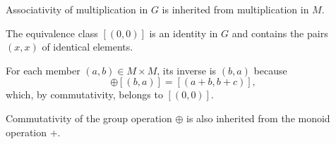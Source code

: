\begin{defproof}
   Associativity of multiplication in \( G \) is inherited from multiplication in \( M \).

   The equivalence class \( [(0, 0)] \) is an identity in \( G \) and contains the pairs \( (x, x) \) of identical elements.

   For each member \( (a, b) \in M \times M \), its inverse is \( (b, a) \) because
  \begin{equation*}
    [(a, b)] \oplus [(b, a)] = [(a + b, b + c)],
  \end{equation*}
  which, by commutativity, belongs to \( [(0, 0)] \).

   Commutativity of the group operation \( \oplus \) is also inherited from the monoid operation \( + \).
\end{defproof}

